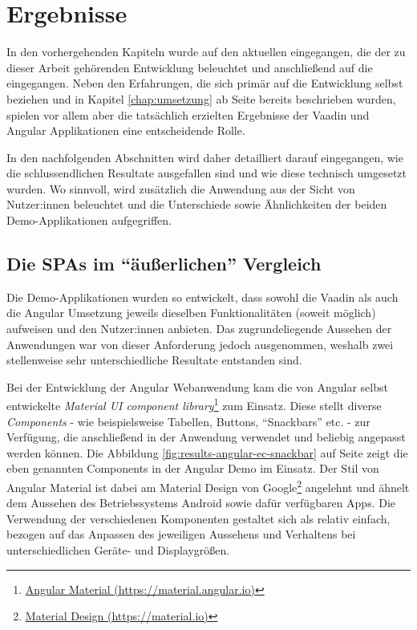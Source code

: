 \documentclass[a4paper,12pt,twoside]{scrreprt}
\begin{document}
\chapter{Ergebnisse}
\label{chap:ergebnisse}
In den vorhergehenden Kapiteln wurde auf den aktuellen \textit{} eingegangen, die \textit{} der zu dieser Arbeit gehörenden Entwicklung beleuchtet und anschließend auf die \textit{} eingegangen. Neben den Erfahrungen, die sich primär auf die Entwicklung selbst beziehen und in Kapitel \ref{chap:umsetzung} ab Seite \pageref{chap:umsetzung} bereits beschrieben wurden, spielen vor allem aber die tatsächlich erzielten Ergebnisse der Vaadin und Angular Applikationen eine entscheidende Rolle.

In den nachfolgenden Abschnitten wird daher detailliert darauf eingegangen, wie die schlussendlichen Resultate ausgefallen sind und wie diese technisch umgesetzt wurden. Wo sinnvoll, wird zusätzlich die Anwendung aus der Sicht von Nutzer:innen beleuchtet und die Unterschiede sowie Ähnlichkeiten der beiden Demo-Applikationen aufgegriffen.

\section{Die \acsp{SPA} im \enquote{äußerlichen} Vergleich}
\label{sec:applikationen-design-vergleich}
Die Demo-Applikationen wurden so entwickelt, dass sowohl die Vaadin als auch die Angular Umsetzung jeweils dieselben Funktionalitäten (soweit möglich) aufweisen und den Nutzer:innen anbieten. Das zugrundeliegende Aussehen der Anwendungen war von dieser Anforderung jedoch ausgenommen, weshalb zwei stellenweise sehr unterschiedliche Resultate entstanden sind.

\medskip

Bei der Entwicklung der Angular Webanwendung kam die von Angular selbst entwickelte \textit{Material UI component library}\footnote{\href{https://material.angular.io/}{Angular Material (https://material.angular.io)}} zum Einsatz. Diese stellt diverse \textit{Components} - wie beispielsweise Tabellen, Buttons, \enquote{Snackbars} etc. - zur Verfügung, die anschließend in der Anwendung verwendet und beliebig angepasst werden können. Die Abbildung \ref{fig:results-angular-ec-snackbar} auf Seite \pageref{fig:results-angular-ec-snackbar} zeigt die eben genannten Components in der Angular Demo im Einsatz. Der Stil von Angular Material ist dabei am Material Design von Google\footnote{\href{https://material.io/}{Material Design (https://material.io)}} angelehnt und ähnelt dem Aussehen des Betriebssystems Android sowie dafür verfügbaren Apps. Die Verwendung der verschiedenen Komponenten gestaltet sich als relativ einfach, bezogen auf das Anpassen des jeweiligen Aussehens und Verhaltens bei unterschiedlichen Geräte- und Displaygrößen.
\end{document}
